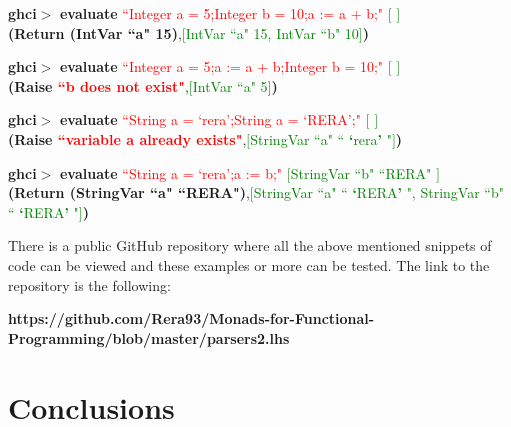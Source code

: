 \documentclass[a4paper, onecolumn]{article}
\begin{document}
    \begin{center}
            \textbf{ghci$>$} \textbf{evaluate} \textcolor{red}{``Integer a = 5;Integer b = 10;a := a + b;"} \textcolor{green}{ $\big[$ $\big]$} \\
             \textbf{(Return (IntVar ``a" 15)},\textcolor{green}{$\big[$IntVar ``a" 15, IntVar ``b" 10$\big]$}\textbf{)}
        \end{center}
        
        \begin{center}
            \textbf{ghci$>$} \textbf{evaluate} \textcolor{red}{``Integer a = 5;a := a + b;Integer b = 10;"} \textcolor{green}{ $\big[$ $\big]$} \\
             \textbf{(Raise \textcolor{red}{``b does not exist"}},\textcolor{green}{$\big[$IntVar ``a" 5$\big]$}\textbf{)}
        \end{center}
        
         \begin{center}
            \textbf{ghci$>$} \textbf{evaluate} \textcolor{red}{``String a = `rera';String a = `RERA';"} \textcolor{green}{ $\big[$ $\big]$} \\
             \textbf{(Raise \textcolor{red}{``variable a already exists"}},\textcolor{green}{$\big[$StringVar ``a" `` \textbf{`}rera\textbf{'} "$\big]$}\textbf{)}
        \end{center}
    
    \begin{center}
            \textbf{ghci$>$} \textbf{evaluate} \textcolor{red}{``String a = `rera';a := b;"} \textcolor{green}{ $\big[$StringVar ``b" ``RERA" $\big]$} \\
             \textbf{(Return (StringVar ``a" ``RERA")},\textcolor{green}{$\big[$StringVar ``a" `` \textbf{`}RERA\textbf{'} ", StringVar ``b" `` \textbf{`}RERA\textbf{'} "$\big]$}\textbf{)}
        \end{center}
        
    \noindent There is a public GitHub repository where all the above mentioned snippets of code can be viewed and these examples or more can be tested. The link to the repository is the following:
    \begin{center}
        \textbf{https://github.com/Rera93/Monads-for-Functional-Programming/blob/master/parsers2.lhs}
    \end{center}
    
    \section{Conclusions}
    
\end{document}
